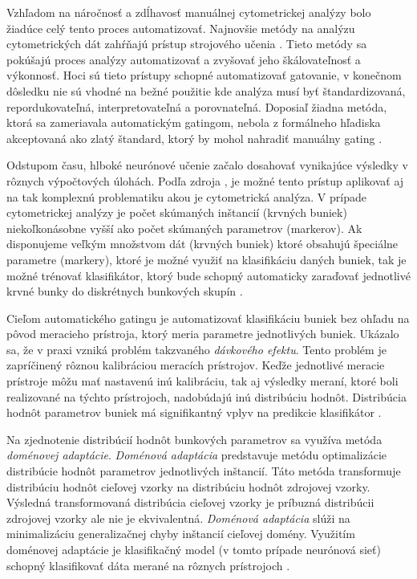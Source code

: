 Vzhľadom na náročnosť a zdĺhavosť manuálnej cytometrickej analýzy bolo žiadúce celý tento proces automatizovať. Najnovšie metódy na analýzu cytometrických dát zahŕňajú prístup strojového učenia \cite{Li2016}. Tieto metódy sa pokúšajú proces analýzy automatizovať a zvyšovať jeho škálovateľnosť a výkonnosť. Hoci sú tieto prístupy schopné automatizovať gatovanie, v konečnom dôsledku nie sú vhodné na bežné použitie kde analýza musí byť štandardizovaná, repordukovateľná, interpretovateľná a porovnateľná. Doposiaľ žiadna metóda, ktorá sa zameriavala automatickým gatingom, nebola z formálneho hľadiska akceptovaná ako zlatý štandard, ktorý by mohol nahradiť manuálny gating \cite{Li2017}.

Odstupom času, hlboké neurónové učenie začalo dosahovať vynikajúce výsledky v rôznych výpočtových úlohách. Podľa zdroja \cite{Li2016}, je možné tento prístup aplikovať aj na tak komplexnú problematiku akou je cytometrická analýza. V prípade cytometrickej analýzy je počet skúmaných inštancií (krvných buniek) niekoľkonásobne vyšší ako počet skúmaných parametrov (markerov). Ak disponujeme veľkým množstvom dát (krvných buniek) ktoré obsahujú špeciálne parametre (markery), ktoré je možné využiť na klasifikáciu daných buniek, tak je možné trénovať klasifikátor, ktorý bude schopný automaticky zaraďovať jednotlivé krvné bunky do diskrétnych bunkových skupín \cite{Li2016}.

Cieľom automatického gatingu je automatizovať klasifikáciu buniek bez ohľadu na pôvod meracieho prístroja, ktorý meria parametre jednotlivých buniek. Ukázalo sa, že v praxi vzniká problém takzvaného \textit{dávkového efektu}. Tento problém je zapríčinený rôznou kalibráciou meracích prístrojov. Keďže jednotlivé meracie prístroje môžu mať nastavenú inú kalibráciu, tak aj výsledky meraní, ktoré boli realizované na týchto prístrojoch, nadobúdajú inú distribúciu hodnôt. Distribúcia hodnôt parametrov buniek má signifikantný vplyv na predikcie klasifikátor \cite{Li2017}.

Na zjednotenie distribúcií hodnôt bunkových parametrov sa využíva metóda \textit{doménovej adaptácie}. \textit{Doménová adaptácia} predstavuje metódu optimalizácie distribúcie hodnôt parametrov jednotlivých inštancií. Táto metóda transformuje distribúciu hodnôt cieľovej vzorky na distribúciu hodnôt zdrojovej vzorky. Výsledná transformovaná distribúcia cieľovej vzorky je príbuzná distribúcii zdrojovej vzorky ale nie je ekvivalentná. \textit{Doménová adaptácia} slúži na minimalizáciu generalizačnej chyby inštancií cieľovej domény. Využitím doménovej adaptácie je klasifikačný model (v tomto prípade neurónová sieť) schopný klasifikovať dáta merané na rôznych prístrojoch \cite{Li2016, Li2017}.

